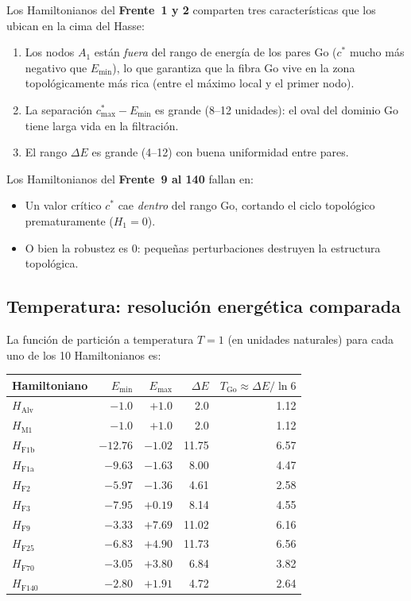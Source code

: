 \documentclass[11pt,a4paper]{article}
\newcommand{\dE}{\Delta E}
\begin{document}
\begin{tcolorbox}[theorembox,title={Patrón general observado}]
Los Hamiltonianos del \textbf{Frente~1 y 2} comparten tres características
que los ubican en la cima del Hasse:
\begin{enumerate}[noitemsep]
  \item Los nodos $A_1$ están \emph{fuera} del rango de energía de los pares Go
        ($c^*$ mucho más negativo que $E_{\min}$), lo que garantiza que la
        fibra Go vive en la zona topológicamente más rica (entre el máximo
        local y el primer nodo).
  \item La separación $c^*_{\max} - E_{\min}$ es grande (8--12 unidades):
        el oval del dominio Go tiene larga vida en la filtración.
  \item El rango $\dE$ es grande (4--12) con buena uniformidad entre pares.
\end{enumerate}

Los Hamiltonianos del \textbf{Frente~9 al 140} fallan en:
\begin{itemize}[noitemsep]
  \item Un valor crítico $c^*$ cae \emph{dentro} del rango Go, cortando
        el ciclo topológico prematuramente ($H_1=0$).
  \item O bien la robustez es 0: pequeñas perturbaciones destruyen la
        estructura topológica.
\end{itemize}
\end{tcolorbox}

\subsection{Temperatura: resolución energética comparada}

La función de partición a temperatura $T=1$ (en unidades naturales) para
cada uno de los 10 Hamiltonianos es:

\begin{center}
\begin{tabular}{lrrrr}
  \toprule
  Hamiltoniano & $E_{\min}$ & $E_{\max}$ & $\dE$ & $T_{\text{Go}}\approx \dE/\ln 6$ \\
  \midrule
  $H_{\text{Alv}}$  & $-1.0$ & $+1.0$ & 2.0  & 1.12 \\
  $H_{\text{M1}}$   & $-1.0$ & $+1.0$ & 2.0  & 1.12 \\
  $H_{\text{F1b}}$  & $-12.76$ & $-1.02$ & 11.75 & 6.57 \\
  $H_{\text{F1a}}$  & $-9.63$ & $-1.63$ & 8.00  & 4.47 \\
  $H_{\text{F2}}$   & $-5.97$ & $-1.36$ & 4.61  & 2.58 \\
  $H_{\text{F3}}$   & $-7.95$ & $+0.19$ & 8.14  & 4.55 \\
  $H_{\text{F9}}$   & $-3.33$ & $+7.69$ & 11.02 & 6.16 \\
  $H_{\text{F25}}$  & $-6.83$ & $+4.90$ & 11.73 & 6.56 \\
  $H_{\text{F70}}$  & $-3.05$ & $+3.80$ & 6.84  & 3.82 \\
  $H_{\text{F140}}$ & $-2.80$ & $+1.91$ & 4.72  & 2.64 \\
  \bottomrule
\end{tabular}
\end{center}
\end{document}
